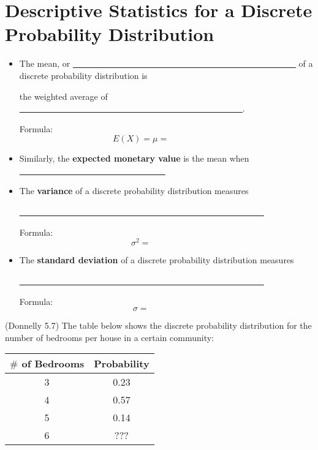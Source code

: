 \documentclass[12pt, letterpaper]{article}
\newcounter{exercise}
\theoremstyle{definition}
\begin{document}
\section*{Descriptive Statistics for a Discrete Probability Distribution}

\begin{itemize}

\item The mean, or \underline{~~~~~~~~~~~~~~~~~~~~~~~~~~~~~~~~~~~~~~~~~~~~~~~~~~~~} of a discrete probability distribution is 

\vspace*{.1in}

the weighted average of \underline{~~~~~~~~~~~~~~~~~~~~~~~~~~~~~~~~~~~~~~~~~~~~~~~~~~~~}.

\vspace*{.2in}
Formula:
$$ E(X) = \mu = ~~~~~~~~~~~~~~~~~~~~~~~~~~~ $$
\vspace*{.2in}

\item Similarly, the \textbf{expected monetary value} is the mean when \underline{~~~~~~~~~~~~~~~~~~~~~~~~~~~~~~~~~~}

\item The \textbf{variance} of a discrete probability distribution measures

\vspace*{.1in}
 \underline{~~~~~~~~~~~~~~~~~~~~~~~~~~~~~~~~~~~~~~~~~~~~~~~~~~~~~~~~~}

\vspace*{.2in}
Formula:
$$ \sigma^2 = ~~~~~~~~~~~~~~~~~~~~~~~~~~~ $$
\vspace*{.2in}


\item The \textbf{standard deviation} of a discrete probability distribution measures

\vspace*{.1in}
 \underline{~~~~~~~~~~~~~~~~~~~~~~~~~~~~~~~~~~~~~~~~~~~~~~~~~~~~~~~~~}

Formula:
$$ \sigma = ~~~~~~~~~~~~~~~~~~~~~~~~~~~ $$
\vspace*{.2in}


\end{itemize}


\begin{exercise} (Donnelly 5.7)
The table below shows the discrete probability distribution for the number of bedrooms per house in a certain community:
\begin{center}
\begin{tabular}{c|c}
\textbf{$\#$ of Bedrooms} & \textbf{Probability}\\ \hline
3 & 0.23\\
4 & 0.57\\
5 & 0.14\\
6 & ???
\end{tabular}
\end{center}
\end{exercise}
\end{document}
